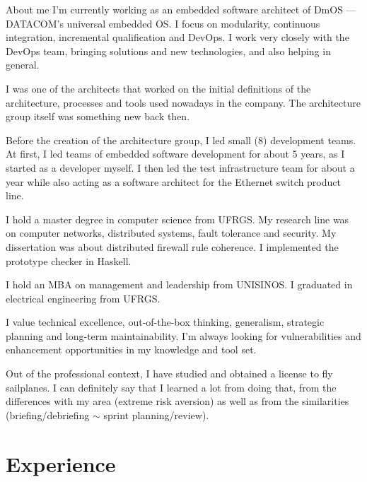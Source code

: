 \documentclass[ignorenonframetext]{beamer}
\begin{document}
\begin{frame}[allowframebreaks]{About me}
    I'm currently working as an embedded software architect of DmOS ---
DATACOM's universal embedded OS. I focus on modularity, continuous
integration, incremental qualification and DevOps. I work very closely
with the DevOps team, bringing solutions and new technologies, and also
helping in general.

\vspace{0.3cm}I was one of the architects that worked on the initial definitions of
the architecture, processes and tools used nowadays in the company. The
architecture group itself was something new back then.

\vspace{0.3cm}Before the creation of the architecture group, I led small (8)
development teams. At first, I led teams of embedded software
development for about 5 years, as I started as a developer myself. I
then led the test infrastructure team for about a year while also acting
as a software architect for the Ethernet switch product line.

\vspace{0.3cm}I hold a master degree in computer science from UFRGS. My research line
was on computer networks, distributed systems, fault tolerance and
security. My dissertation was about distributed firewall rule coherence.
I implemented the prototype checker in Haskell.

\vspace{0.3cm}I hold an MBA on management and leadership from UNISINOS. I graduated in
electrical engineering from UFRGS.

\vspace{0.3cm}I value technical excellence, out-of-the-box thinking, generalism,
strategic planning and long-term maintainability. I'm always looking for
vulnerabilities and enhancement opportunities in my knowledge and tool
set.

\vspace{0.3cm}Out of the professional context, I have studied and obtained a license
to fly sailplanes. I can definitely say that I learned a lot from doing
that, from the differences with my area (extreme risk aversion) as well
as from the similarities (briefing/debriefing \(\sim\) sprint
planning/review).

\end{frame}


\section{Experience}
\end{document}
